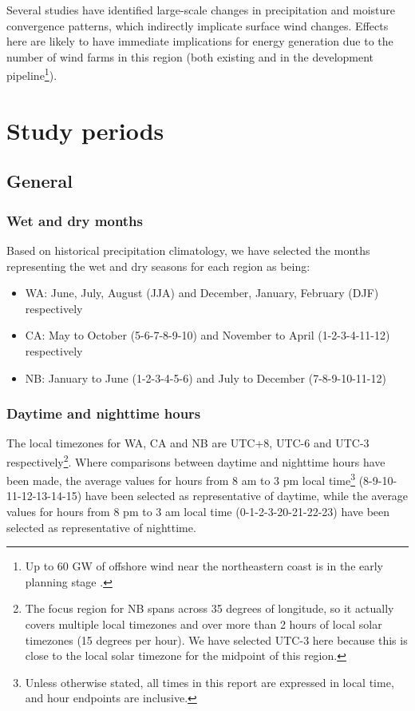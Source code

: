 Several studies have identified large-scale changes in precipitation and moisture convergence patterns, which indirectly implicate surface wind changes. Effects here are likely to have immediate implications for energy generation due to the number of wind farms in this region (both existing and in the development pipeline\footnote{Up to 60 GW of offshore wind near the northeastern coast is in the early planning stage \citep{offshore_map}.}).

\section{Study periods}

\subsection{General}

\subsubsection{Wet and dry months}

Based on historical precipitation climatology, we have selected the months representing the wet and dry seasons for each region as being:
\begin{itemize}
	\item \ac{WA}: June, July, August (JJA) and December, January, February (DJF) respectively
	\item \ac{CA}: May to October (5-6-7-8-9-10) and November to April (1-2-3-4-11-12) respectively
	\item \ac{NB}: January to June (1-2-3-4-5-6) and July to December (7-8-9-10-11-12)
\end{itemize}

\subsubsection{Daytime and nighttime hours}

The local timezones for \ac{WA}, \ac{CA} and \ac{NB} are UTC+8, UTC-6 and UTC-3 respectively\footnote{The focus region for \ac{NB} spans across 35 degrees of longitude, so it actually covers multiple local timezones and over more than 2 hours of local solar timezones (15 degrees per hour). We have selected UTC-3 here because this is close to the local solar timezone for the midpoint of this region.}. Where comparisons between daytime and nighttime hours have been made, the average values for hours from 8 am to 3 pm local time\footnote{Unless otherwise stated, all times in this report are expressed in local time, and hour endpoints are inclusive.} (8-9-10-11-12-13-14-15) have been selected as representative of daytime, while the average values for hours from 8 pm to 3 am local time (0-1-2-3-20-21-22-23) have been selected as representative of nighttime.

